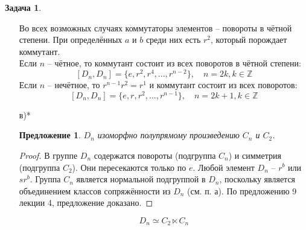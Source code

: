 \documentclass[12pt]{article}
\newtheorem{predl}[theorem]{Предложение}
\theoremstyle{definition}
\newtheorem{zad}{Задача}[section]
\begin{document}
\begin{zad}
\begin{itemize}
\begin{enumerate}
    \end{enumerate}
    Во всех возможных случаях коммутаторы элементов -- повороты в чётной степени. При определённых $a$ и $b$ среди них есть $r^2$, который порождает коммутант.\\
    Если $n$ -- чётное, то коммутант состоит из всех поворотов в чётной степени:
    \begin{equation}
        \boxed{[D_n,D_n]=\{e,r^2,r^4,...,r^{n-2}\},\quad n=2k,k\in\mathbb{Z}}
    \end{equation}
    Если $n$ -- нечётное, то $r^{n-1}r^2=r^1$ и коммутант состоит из всех поворотов:
    \begin{equation}
        \boxed{[D_n,D_n]=\{e,r,r^2,...,r^{n-1}\},\quad n=2k+1,k\in\mathbb{Z}}
    \end{equation}
    \item[в)*] 
    \begin{predl}
        $D_n$ изоморфно полупрямому произведению $C_n$ и $C_2$.
    \end{predl}
    \begin{proof}
        В группе $D_n$ содержатся повороты (подгруппа $C_n$) и симметрия (подгруппа $C_2$). Они пересекаются только по $e$. Любой элемент $D_n$ -- $r^b$ или $sr^b$. Группа $C_n$ является нормальной подгруппой в $D_n$, поскольку является объединением классов сопряжённости из $D_n$ (см. п. а). По предложению 9 лекции 4, предложение доказано.
    \end{proof}
    \begin{equation}
        \boxed{D_n\simeq C_2\ltimes C_n}
    \end{equation}
\end{itemize}
\end{zad}
\end{document}
